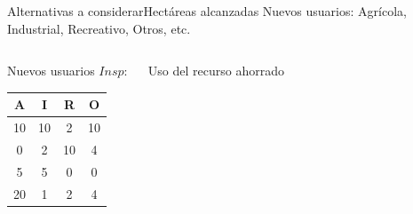 \documentclass{beamer}\usepackage[]{graphicx}\usepackage[]{color}
\begin{document}
\begin{frame}{Alternativas a considerar}{Hectáreas alcanzadas}
  Nuevos usuarios: Agrícola, Industrial, Recreativo, Otros, etc.
  \begin{columns}[t]
    \begin{exampleblock}{Nuevos usuarios}
      $Insp\colon$
      \begin{tabular}{cccc}
        A  & I  & R & O \\\hline
        10 & 10 & 2 & 10 \\
        0  & 2  & 10 & 4\\
        5  & 5  & 0 & 0\\
        20 & 1  & 2 & 4
      \end{tabular}
    \end{exampleblock}


    \begin{exampleblock}{Uso del recurso ahorrado}
      \begin{center}
      \end{center}
    \end{exampleblock}
  \end{columns}
  
\end{frame}
\end{document}
